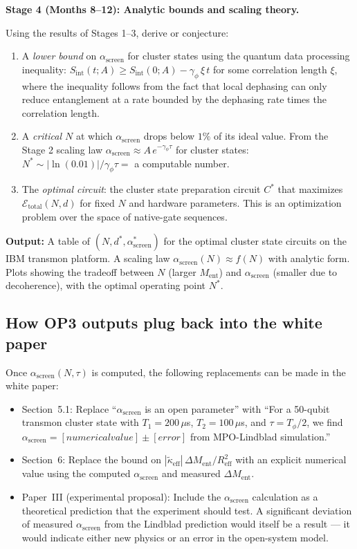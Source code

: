 \documentclass[12pt,letterpaper]{article}
\theoremstyle{plain}
\theoremstyle{definition}
\theoremstyle{remark}
\newcommand{\kteff}{\tilde{\kappa}_{\mathrm{eff}}}
\newcommand{\Ment}{M_{\mathrm{ent}}}
\newcommand{\asc}{\alpha_{\mathrm{screen}}}
\newcommand{\sint}{S_{\mathrm{int}}}
\begin{document}
\begin{opbox}
\textbf{Stage 4 (Months 8--12): Analytic bounds and scaling theory.}

Using the results of Stages 1--3, derive or conjecture:
\begin{enumerate}
\item A \emph{lower bound} on $\asc$ for cluster states using the quantum data processing inequality:
  $\sint(t; A) \geq \sint(0; A) - \gamma_\phi\,\xi\,t$ for some correlation length $\xi$,
  where the inequality follows from the fact that local dephasing can only reduce entanglement at a rate bounded by the dephasing rate times the correlation length.
\item A \emph{critical $N$} at which $\asc$ drops below $1\%$ of its ideal value.
  From the Stage 2 scaling law $\asc \approx A\,e^{-\gamma_\phi\tau}$ for cluster states:
  $N^* \sim |\ln(0.01)|/\gamma_\phi\tau = $ a computable number.
\item The \emph{optimal circuit}: the cluster state preparation circuit $C^*$ that maximizes $\mathcal{E}_{\mathrm{total}}(N,d)$ for fixed $N$ and hardware parameters. This is an optimization problem over the space of native-gate sequences.
\end{enumerate}

\textbf{Output:} A table of $(N, d^*, \asc^*)$ for the optimal cluster state circuits on the IBM transmon platform. A scaling law $\asc(N) \approx f(N)$ with analytic form. Plots showing the tradeoff between $N$ (larger $\Ment$) and $\asc$ (smaller due to decoherence), with the optimal operating point $N^*$.
\end{opbox}

\subsection{How OP3 outputs plug back into the white paper}

Once $\asc(N,\tau)$ is computed, the following replacements can be made in the white paper:

\begin{itemize}
\item Section~5.1: Replace ``$\asc$ is an open parameter'' with ``For a 50-qubit transmon cluster state with $T_1 = 200\,\mu$s, $T_2 = 100\,\mu$s, and $\tau = T_\phi/2$, we find $\asc = [numerical value] \pm [error]$ from MPO-Lindblad simulation.''
\item Section~6: Replace the bound on $|\kteff|\,\Delta\Ment/R_{\mathrm{eff}}^2$ with an explicit numerical value using the computed $\asc$ and measured $\Delta\Ment$.
\item Paper~III (experimental proposal): Include the $\asc$ calculation as a theoretical prediction that the experiment should test. A significant deviation of measured $\asc$ from the Lindblad prediction would itself be a result --- it would indicate either new physics or an error in the open-system model.
\end{itemize}
\end{document}

